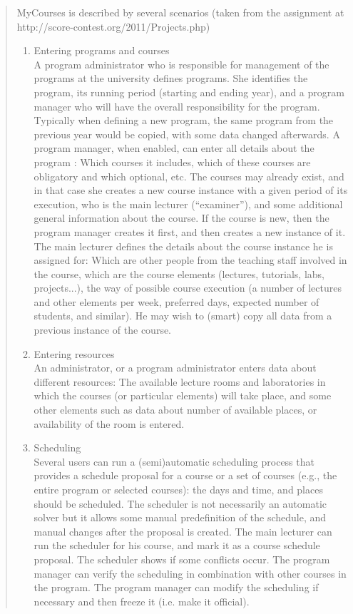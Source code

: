 \documentclass{article}
\begin{document}
\begin{quotation}
MyCourses is described by several scenarios (taken from the assignment at http://score-contest.org/2011/Projects.php)\\[-4mm]
\begin{enumerate}
\item Entering programs and courses \\
A program administrator who is responsible for management of the programs at the university defines programs. She identifies the program, its running period (starting and ending year), and a program manager who will have the overall responsibility for the program. Typically when defining a new program, the same program from the previous year would be copied, with some data changed afterwards. A program manager, when enabled, can enter all details about the program : Which courses it includes, which of these courses are obligatory and which optional, etc. The courses may already exist, and in that case she creates a new course instance with a given period of its execution, who is the main lecturer (``examiner''), and some additional general information about the course. If the course is new, then the program manager creates it first, and then creates a new instance of it.\\
The main lecturer defines the details about the course instance he is assigned for: Which are other people from the teaching staff involved in the course, which are the course elements (lectures, tutorials, labs, projects...), the way of possible course execution (a number of lectures and other elements per week, preferred days, expected number of students, and similar). He may wish to (smart) copy all data from a previous instance of the course.
\item Entering resources \\
An administrator, or a program administrator enters data about different resources: The available lecture rooms and laboratories in which the courses (or particular elements) will take place, and some other elements such as data about number of available places, or availability of the room is entered.
\item Scheduling \\
Several users can run a (semi)automatic scheduling process that provides a schedule proposal for a course or a set of courses (e.g., the entire program or selected courses): the days and time, and places should be scheduled. The scheduler is not necessarily an automatic solver but it allows some manual predefinition of the schedule, and manual changes after the proposal is created. The main lecturer can run the scheduler for his course, and mark it as a course schedule proposal. The scheduler shows if some conflicts occur. The program manager can verify the scheduling in combination with other courses in the program. The program manager can modify the scheduling if necessary and then freeze it (i.e. make it official).

\end{enumerate}
\end{quotation}
\end{document}
